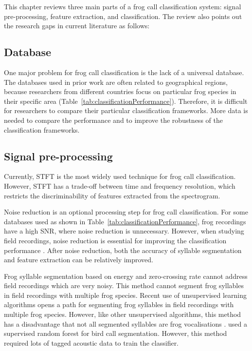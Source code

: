 This chapter reviews three main parts of a frog call classification system: signal pre-processing, feature extraction, and classification. The review also points out the research gaps in current literature as follows:

\subsection{Database}
One major problem for frog call classification is the lack of a universal database. The databases used in prior work are often related to geographical regions, because researchers from different countries focus on particular frog species in their specific area (Table~\ref{tab:classificationPerformance}). Therefore, it is difficult for researchers to compare their particular classification frameworks. More data is needed to compare the performance and to improve the robustness of the classification frameworks. 



\subsection{Signal pre-processing}
Currently, STFT is the most widely used technique for frog call classification. However, STFT has a trade-off between time and frequency resolution, which restricts the discriminability of features extracted from the spectrogram. 

Noise reduction is an optional processing step for frog call classification. For some databases used as shown in Table~\ref{tab:classificationPerformance}, frog recordings have a high SNR, where noise reduction is unnecessary. However, when studying field recordings, noise reduction is essential for improving the classification performance \citep{bedoya2014automatic, Huang20141}. After noise reduction, both the accuracy of syllable segmentation and feature extraction can be relatively improved.

Frog syllable segmentation based on energy and zero-crossing rate cannot address field recordings which are very noisy. This method cannot segment frog syllables in field recordings with multiple frog species. Recent use of unsupervised learning algorithms opens a path for segmenting frog syllables in field recordings with multiple frog species. However, like other unsupervised algorithms, this method has a disadvantage that not all segmented syllables are frog vocalisations \citep{potamitis2015unsupervised}. \citet{briggs2012acoustic} used a supervised random forest for bird call segmentation. However, this method required lots of tagged acoustic data to train the classifier.


